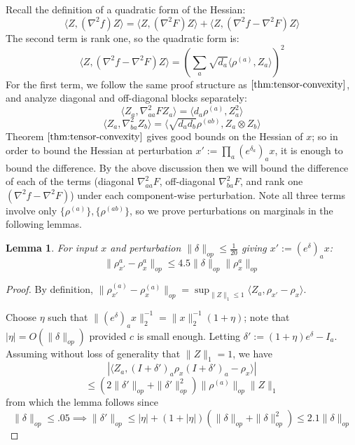 \documentclass{article}
\newtheorem{lemma}[theorem]{Lemma}
\newcommand\samp{x}
\begin{document}
Recall the definition of a quadratic form of the Hessian:
\[ \langle Z, (\nabla^{2} f) Z \rangle = \langle Z, (\nabla^{2} F) Z \rangle + \langle Z, (\nabla^{2} f - \nabla^{2} F) Z \rangle     \]
The second term is rank one, so the quadratic form is:
\[ \langle Z, (\nabla^{2} f - \nabla^{2} F) Z \rangle = \left( \sum_{a} \sqrt{d_{a}} \langle \rho^{(a)}, Z_{a} \rangle   \right)^{2}       \]
For the first term, we follow the same proof structure as $\ref{thm:tensor-convexity}$, and analyze diagonal and off-diagonal blocks separately:
\[ \langle Z_{a}, \nabla^{2}_{aa} F Z_{a} \rangle = \langle d_{a} \rho^{(a)}, Z_{a}^{2} \rangle       \]
\[ \langle Z_{a}, \nabla^{2}_{ba} Z_{b} \rangle = \langle \sqrt{d_{a} d_{b}} \rho^{(ab)}, Z_{a} \otimes Z_{b} \rangle   \]
Theorem $\ref{thm:tensor-convexity}$ gives good bounds on the Hessian of $\samp$; so in order to bound the Hessian at perturbation $\samp' := \prod_{a} (e^{\delta_{a}})_{a} \samp$, it is enough to bound the difference. By the above discussion then we will bound the difference of each of the terms (diagonal $\nabla^{2}_{aa} F$, off-diagonal $\nabla^{2}_{ba} F$, and rank one $(\nabla^{2} f - \nabla^{2} F)$) under each component-wise perturbation. Note all three terms involve only $\{\rho^{(a)}\}, \{\rho^{(ab)}\}$, so we prove perturbations on marginals in the following lemmas.  

\begin{lemma} \label{atoaaRobustness}
For input $\samp$ and perturbation $\|\delta\|_{op} \leq \frac{1}{20}$ giving $\samp' := (e^{\delta})_{a} \samp$:
\[ \|\rho_{\samp'}^{a} - \rho_{\samp}^{a}\|_{op} \leq 4.5 \|\delta\|_{op} \|\rho_{\samp}^{a}\|_{op}     \]
\end{lemma}
\begin{proof} By definition, $\|\rho_{\samp'}^{(a)} - \rho_{\samp}^{(a)}\|_{op} = \sup_{\|Z\|_{1} \leq 1} \langle Z_{a}, \rho_{\samp'} - \rho_{\samp} \rangle $. 


Choose $\eta$ such that  $\|(e^{\delta})_{a} \samp\|_{2}^{-1} = \|\samp\|_{2}^{-1} (1 + \eta)$; note that $|\eta| = O(\|\delta\|_{op})$ provided $c$ is small enough. Letting $\delta' := (1+\eta)e^{\delta} - I_{a}$. Assuming without loss of generality that $\|Z\|_{1} = 1$, we have 
\[ | \langle Z_{a}, (I+\delta')_a \rho_{\samp} (I+\delta')_a - \rho_{\samp} \rangle | \]
\[ \leq (2\|\delta'\|_{op} + \|\delta'\|_{op}^{2}) \|\rho^{(a)}\|_{op} \|Z\|_{1}    \]
from which the lemma follows since 
\[ \|\delta\|_{op} \leq .05 \implies \|\delta'\|_{op} \leq |\eta| + (1+|\eta|)(\|\delta\|_{op} + \|\delta\|_{op}^{2}) \leq  2.1 \|\delta\|_{op} \]
\end{proof}
\end{document}
